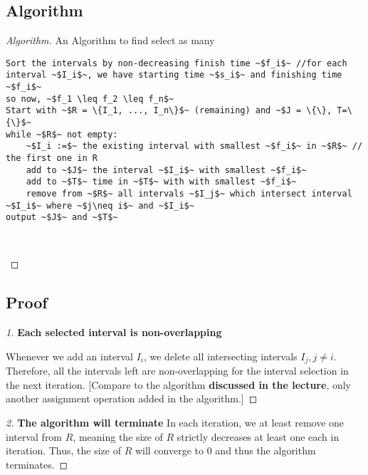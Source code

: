 \documentclass[openany]{article}
\begin{document}
\subsection*{Algorithm}
\begin{proof}[Algorithm]{}
		\renewcommand{\qedsymbol}{}
		An Algorithm to find select as many 
		\begin{lstlisting}[basicstyle=\fontsize{8}{9}\selectfont\ttfamily]
Sort the intervals by non-decreasing finish time ~$f_i$~ //for each interval ~$I_i$~, we have starting time ~$s_i$~ and finishing time ~$f_i$~
so now, ~$f_1 \leq f_2 \leq f_n$~
Start with ~$R = \{I_1, ..., I_n\}$~ (remaining) and ~$J = \{\}, T=\{\}$~
while ~$R$~ not empty:
    ~$I_i :=$~ the existing interval with smallest ~$f_i$~ in ~$R$~ // the first one in R
    add to ~$J$~ the interval ~$I_i$~ with smallest ~$f_i$~
    add to ~$T$~ time in ~$T$~ with with smallest ~$f_i$~
    remove from ~$R$~ all intervals ~$I_j$~ which intersect interval ~$I_i$~ where ~$j\neq i$~ and ~$I_i$~
output ~$J$~ and ~$T$~

        
		\end{lstlisting} 
\end{proof}

\subsection*{Proof}


\begin{proof}[1] \textbf{Each selected interval is non-overlapping}

    Whenever we add an interval $I_i$, we delete all intersecting intervals $I_j, j\neq i$. Therefore, all the intervals left are non-overlapping for the interval selection in the next iteration. [Compare to the algorithm \textbf{discussed in the lecture}, only another assignment operation added in the algorithm.]
\end{proof}

\begin{proof}[2] \textbf{The algorithm will terminate}
    In each iteration, we at least remove one interval from $R$, meaning the size of $R$ strictly decreases at least one each in iteration. Thus, the size of $R$ will converge to 0 and thus the algorithm terminates.
\end{proof}
\end{document}
